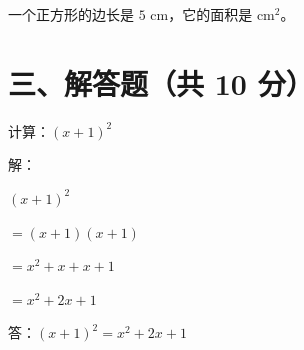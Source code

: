 \documentclass{exam-zh}
\begin{document}
\begin{question}
  一个正方形的边长是 $5$ cm，它的面积是 \fillin[25] $\text{cm}^2$。
\end{question}


\section*{三、解答题（共 10 分）}

\begin{problem}[points = 10]
  计算：$(x + 1)^2$

  \begin{solution}
    解：

    $(x + 1)^2$

    $= (x + 1)(x + 1)$

    $= x^2 + x + x + 1$

    $= x^2 + 2x + 1$

    答：$(x + 1)^2 = x^2 + 2x + 1$
  \end{solution}
\end{problem}
\end{document}
